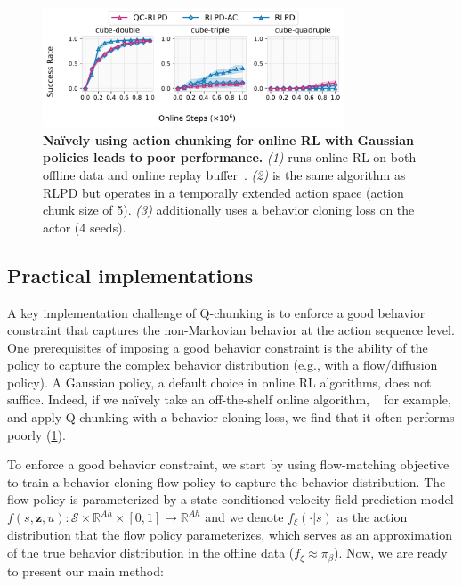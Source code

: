 \begin{figure}[t]
\centering
\includegraphics[width=0.8\textwidth]{figures/rlpd-qc-all.pdf}
\vspace{-0.7em}
\caption{\footnotesize \textbf{Na\"ively using action chunking for online RL with Gaussian policies leads to poor performance.} \emph{(1)}  runs online RL on both offline data and online replay buffer~\citep{ball2023efficient}. \emph{(2)}  is the same algorithm as RLPD but operates in a temporally extended action space (action chunk size of 5). \emph{(3)}  additionally uses a behavior cloning loss on the actor (4 seeds). }
\vspace{-1em}
\label{fig:rlpd-all}
\end{figure}

\subsection{Practical implementations}
A key implementation challenge of Q-chunking is to enforce a good behavior constraint that captures the non-Markovian behavior at the action sequence level. One prerequisites of imposing a good behavior constraint is the ability of the policy to capture the complex behavior distribution (e.g., with a flow/diffusion policy). A Gaussian policy, a default choice in online RL algorithms, does not suffice. Indeed, if we na\"ively take an off-the-shelf online algorithm, ~\citep{ball2023efficient} for example, and apply Q-chunking with a behavior cloning loss, we find that it often performs poorly (\cref{fig:rlpd-all}).

To enforce a good behavior constraint, we start by using flow-matching objective~\citep{liu2022flow} to train a behavior cloning flow policy to capture the behavior distribution. The flow policy is parameterized by a state-conditioned velocity field prediction model $f(s, \mathbf z, u): \mathcal{S} \times \mathbb{R}^{Ah} \times [0, 1] \mapsto \mathbb{R}^{Ah}$ and we denote $f_\xi(\cdot | s)$ as the action distribution that the flow policy parameterizes, which serves as an approximation of the true behavior distribution in the offline data ($f_\xi \approx \pi_\beta$). Now, we are ready to present our main method:

